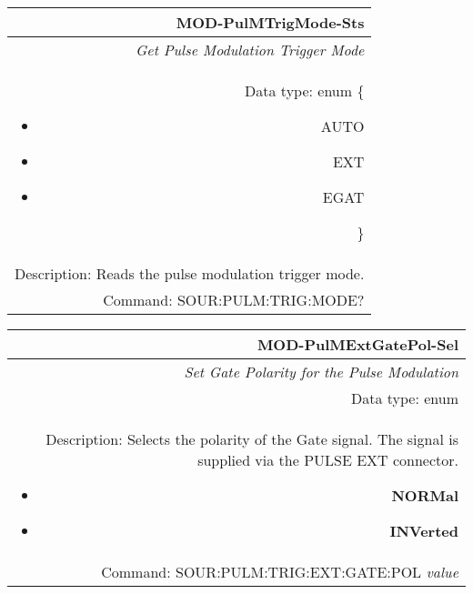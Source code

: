 \documentclass[openany]{article}
\begin{document}
		\begin{tabular}{N}
			\hline
			\bfseries MOD-PulMTrigMode-Sts \\ \hline
			\emph{Get Pulse Modulation Trigger Mode} \\
			Data type: enum \{\begin{itemize}[noitemsep]
				\small
				\item[] AUTO
				\item[] EXT
				\item[] EGAT
			\end{itemize}\} \\ 
			Description: Reads the pulse modulation trigger mode. \\
			Command: SOUR:PULM:TRIG:MODE? \\

		\end{tabular}
%
		\begin{tabular}{N}
			\hline
			\bfseries MOD-PulMExtGatePol-Sel \\ \hline
			\emph{Set Gate Polarity for the Pulse Modulation} \\
			Data type: enum \\  
			Description: Selects the polarity of the Gate signal. The signal is supplied via the PULSE EXT connector. \begin{itemize}[noitemsep]
				\small
				\item[] \textbf{NORMal}
                                \item[] \textbf{INVerted}
			\end{itemize} \\
			Command: SOUR:PULM:TRIG:EXT:GATE:POL \emph{value} \\

		\end{tabular}
\end{document}
